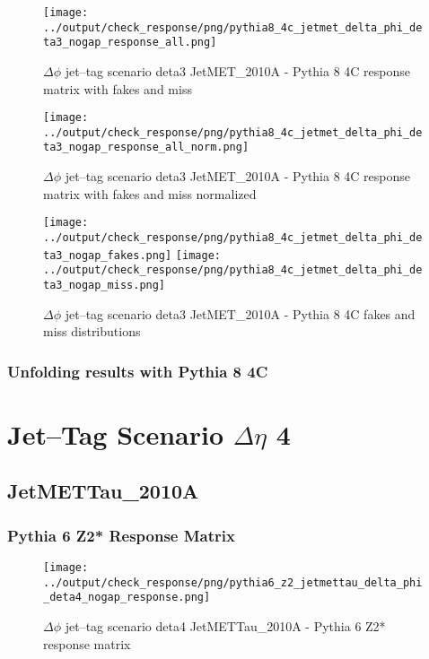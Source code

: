 \documentclass[11pt]{book}
\begin{document}
\begin{figure}[ht]
\centering
\texttt{[image: ../output/check\_response/png/pythia8\_4c\_jetmet\_delta\_phi\_deta3\_nogap\_response\_all.png]}
\caption{$\Delta\phi$ jet--tag scenario deta3 JetMET\_2010A - Pythia 8 4C response matrix with fakes and miss}
\label{p8_jetmet_delta_phi_deta3_nogap_response_all}
\end{figure}

\begin{figure}[ht]
\centering
\texttt{[image: ../output/check\_response/png/pythia8\_4c\_jetmet\_delta\_phi\_deta3\_nogap\_response\_all\_norm.png]}
\caption{$\Delta\phi$ jet--tag scenario deta3 JetMET\_2010A - Pythia 8 4C response matrix with fakes and miss normalized}
\label{p8_jetmet_delta_phi_deta3_nogap_response_all_norm}
\end{figure}

\begin{figure}[ht]
\centering
\texttt{[image: ../output/check\_response/png/pythia8\_4c\_jetmet\_delta\_phi\_deta3\_nogap\_fakes.png]}
\texttt{[image: ../output/check\_response/png/pythia8\_4c\_jetmet\_delta\_phi\_deta3\_nogap\_miss.png]}
\caption{$\Delta\phi$ jet--tag scenario deta3 JetMET\_2010A - Pythia 8 4C fakes and miss distributions}
\label{p8_jetmet_delta_phi_deta3_nogap_fakesmiss}
\end{figure}


\clearpage
\subsection{Unfolding results with Pythia 8 4C}



\newpage
\chapter{Jet--Tag Scenario $\Delta\eta$ 4}
\section{JetMETTau\_2010A}
\subsection{Pythia 6 Z2* Response Matrix}

\begin{figure}[ht]
\centering
\texttt{[image: ../output/check\_response/png/pythia6\_z2\_jetmettau\_delta\_phi\_deta4\_nogap\_response.png]}
\caption{$\Delta\phi$ jet--tag scenario deta4 JetMETTau\_2010A - Pythia 6 Z2* response matrix}
\label{p6_jetmettau_delta_phi_deta4_nogap_response}
\end{figure}
\end{document}
